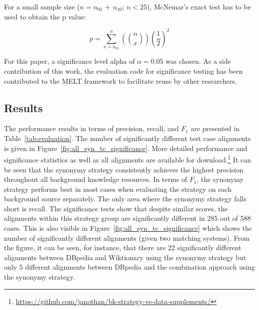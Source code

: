 \documentclass[runningheads]{llncs}
\begin{document}
\noindent For a small sample size ($n = n_{01}$ + $n_{10}$; $n < 25$), McNemar's exact test has to be used to obtain the p value: 

\begin{equation}
p = \sum^{n}_{x=n_{01}} (\binom{n}{x})(\frac{1}{2})^2
\end{equation}

\noindent For this paper, a significance level alpha of $\alpha = 0.05$ was chosen. As a side contribution of this work, the evaluation code for significance testing has been contributed to the MELT framework \cite{hertling_melt_2019} to facilitate reuse by other researchers.


\subsection{Results}
The performance results in terms of precision, recall, and $F_1$ are presented in Table~\ref{tab:evaluation}. The number of significantly different test case alignments is given in Figure~\ref{fig:all_syn_tc_significance}. More detailed performance and significance statistics as well as all alignments are available for download.\footnote{\url{https://github.com/janothan/bk-strategy-vs-data-supplements/}} It can be seen that the synonymy strategy consistently achieves the highest precision throughout all background knowledge resources. 
In terms of $F_1$, the synonymy strategy performs best in most cases when evaluating the strategy on each background source separately. The only area where the synonymy strategy falls short is recall. 
The significance tests show that despite similar scores, the alignments within this strategy group are significantly different in 285 out of 588 cases. This is also visible in Figure~\ref{fig:all_syn_tc_significance} which shows the number of significantly different alignments (given two matching systems). From the figure, it can be seen, for instance, that there are 22 significantly different alignments between DBpedia and Wiktionary using the synonymy strategy but only 5 different alignments between DBpedia and the combination approach using the synonymy strategy.
\end{document}
